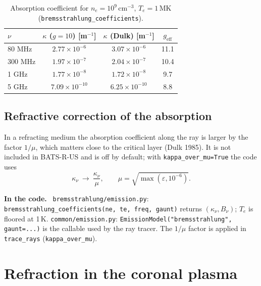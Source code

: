 \documentclass[11pt,a4paper]{article}
\newcommand{\code}[1]{\texttt{#1}}
\newenvironment{incode}{\par\smallskip\noindent\begin{minipage}{\linewidth}\small\color{accent!80!black}\textbf{In the code.}~}{\end{minipage}\par\smallskip}
\begin{document}
\begin{table}[ht]
\centering\small
\caption{Absorption coefficient for $n_e=10^9$\,cm$^{-3}$, $T_e=1$\,MK (\code{bremsstrahlung\_coefficients}).}
\label{tab:kappa}
\begin{tabular}{@{}l c c c@{}}
\toprule
$\nu$ & $\kappa$ ($g=10$) [m$^{-1}$] & $\kappa$ (Dulk) [m$^{-1}$] & $g_\text{eff}$ \\
\midrule
80 MHz  & $2.77\times10^{-6}$ & $3.07\times10^{-6}$ & 11.1 \\
300 MHz & $1.97\times10^{-7}$ & $2.04\times10^{-7}$ & 10.4 \\
1 GHz   & $1.77\times10^{-8}$ & $1.72\times10^{-8}$ & 9.7 \\
5 GHz   & $7.09\times10^{-10}$ & $6.25\times10^{-10}$ & 8.8 \\
\bottomrule
\end{tabular}
\end{table}

\subsection{Refractive correction of the absorption}
In a refracting medium the absorption coefficient along the ray is larger by the factor
$1/\mu$, which matters close to the critical layer (Dulk 1985). It is not included in
BATS-R-US and is off by default; with \code{kappa\_over\_mu=True} the code uses
\begin{equation}
  \kappa_\nu\ \to\ \frac{\kappa_\nu}{\mu},\qquad \mu=\sqrt{\max(\varepsilon,10^{-6})} .
\end{equation}

\begin{incode}
\code{bremsstrahlung/emission.py}: \code{bremsstrahlung\_coefficients(ne, te, freq, gaunt)}
returns $(\kappa_\nu,B_\nu)$; $T_e$ is floored at 1\,K. \code{common/emission.py}:
\code{EmissionModel("bremsstrahlung", gaunt=...)} is the callable used by the ray tracer.
The $1/\mu$ factor is applied in \code{trace\_rays} (\code{kappa\_over\_mu}).
\end{incode}

\section{Refraction in the coronal plasma}\label{sec:refraction}
\end{document}
